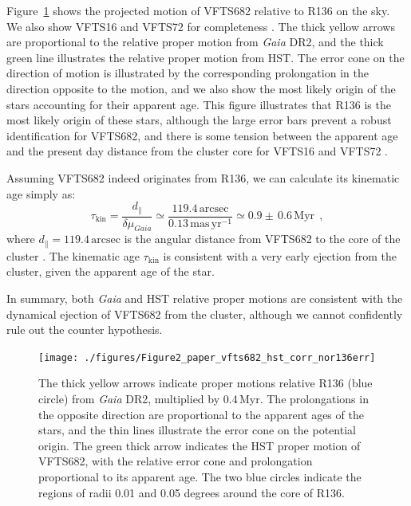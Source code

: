 \documentclass[apjl,twocolumn]{emulateapj}
\newcommand{\masyr}{\,\mathrm{mas}\,\mathrm{yr}^{-1}}
\begin{document}
Figure~\ref{fig:main} shows the projected motion of VFTS682 relative to R136 on the
sky. We also show VFTS16 and VFTS72 for completeness
\citep[see][]{lennon:18}. The thick yellow arrows are proportional to
the relative proper motion from \emph{Gaia} DR2, and the thick green
line illustrates the relative proper motion from HST. The error cone
on the direction of motion is illustrated by the corresponding
prolongation in the direction opposite to the motion, and we also show
the most likely origin of the stars accounting for their apparent age.
This figure illustrates that R136 is the most likely origin of these stars, although the large error bars
prevent a robust identification for VFTS682, and there is some tension
between the apparent age and the present day distance from the cluster
core for VFTS16 and VFTS72 \citep[][]{lennon:18}. 

Assuming VFTS682 indeed originates from R136, we can calculate its kinematic
age simply as:
\begin{equation}
  \label{eq:kin_age}
  \tau_\mathrm{kin} = \frac{d_\parallel}{\delta\mu_{Gaia}} \simeq
  \frac{119.4\,\mathrm{arcsec}}{0.13\masyr} \simeq 0.9\pm\,0.6\, \mathrm{Myr} \ \ ,
\end{equation}
where $d_\parallel = 119.4\,\mathrm{arcsec}$ is the angular distance from VFTS682 to
the core of the cluster \citep[corresponding to $\sim$29\,pc at a
distance of 
50\,kpc,][]{bestenlehner:11}.
The kinematic age $\tau_\mathrm{kin}$ is consistent with a very early
ejection from the cluster, given the apparent age of the star.

In summary, both \emph{Gaia} and HST relative proper motions are consistent with the dynamical ejection of
VFTS682 from the cluster, although we cannot confidently rule out the
counter hypothesis. 

\begin{figure}%
  \centering
  \texttt{[image: ./figures/Figure2\_paper\_vfts682\_hst\_corr\_nor136err]}  
  \caption{The thick yellow arrows indicate proper motions relative R136 (blue
    circle) from \emph{Gaia} DR2, multiplied by 0.4\,Myr. The prolongations in the opposite
    direction are proportional to the apparent ages of the stars, and
    the thin lines illustrate the error cone on the potential
    origin. The green thick arrow
    indicates the HST proper motion of VFTS682, with the relative
    error cone and prolongation proportional to its apparent
    age. The two blue circles indicate the regions of radii 0.01 and 0.05
    degrees around the core of R136.}
  
  \label{fig:main}
\end{figure}
\end{document}

